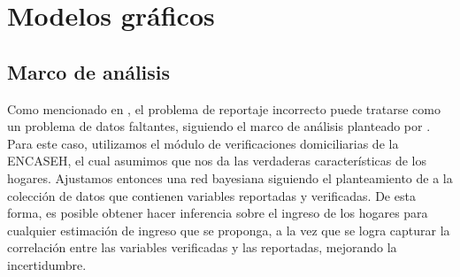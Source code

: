 \chapter{Modelos gráficos}
\label{chap:modelos_graficos}
\section*{Marco de análisis}
Como mencionado en \cite{lfgp_entregable_1}, el problema de reportaje incorrecto puede tratarse como un problema de datos faltantes, siguiendo el marco de análisis planteado por \cite{missing_data}. Para este caso, utilizamos el módulo de verificaciones domiciliarias de la ENCASEH, el cual asumimos que nos da las verdaderas características de los hogares. Ajustamos entonces una red bayesiana siguiendo el planteamiento de \cite{graphical_models} a la colección de datos que contienen variables reportadas y verificadas. De esta forma, es posible obtener hacer inferencia sobre el ingreso de los hogares para cualquier estimación de ingreso que se proponga, a la vez que se logra capturar la correlación entre las variables verificadas y las reportadas, mejorando la incertidumbre.

